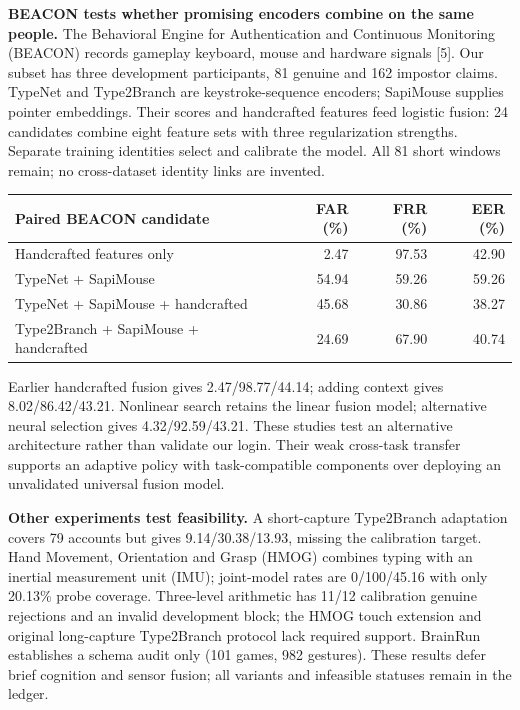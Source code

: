 \documentclass[10pt,a4paper]{article}
\newcommand{\smalltable}{\fontsize{8.5}{10.4}\selectfont}
\begin{document}
\textbf{BEACON tests whether promising encoders combine on the same people.} The Behavioral Engine for Authentication and Continuous Monitoring (BEACON) records gameplay keyboard, mouse and hardware signals [5]. Our subset has three development participants, 81 genuine and 162 impostor claims. TypeNet and Type2Branch are keystroke-sequence encoders; SapiMouse supplies pointer embeddings. Their scores and handcrafted features feed logistic fusion: 24 candidates combine eight feature sets with three regularization strengths. Separate training identities select and calibrate the model. All 81 short windows remain; no cross-dataset identity links are invented.
\begin{center}\smalltable
\begin{tabularx}{\linewidth}{@{}Xrrr@{}}
\toprule
\textbf{Paired BEACON candidate} & \textbf{FAR (\%)} & \textbf{FRR (\%)} & \textbf{EER (\%)}\\\midrule
Handcrafted features only & 2.47 & 97.53 & 42.90\\
TypeNet + SapiMouse & 54.94 & 59.26 & 59.26\\
TypeNet + SapiMouse + handcrafted & 45.68 & 30.86 & 38.27\\
Type2Branch + SapiMouse + handcrafted & 24.69 & 67.90 & 40.74\\\bottomrule
\end{tabularx}
\end{center}
Earlier handcrafted fusion gives 2.47/98.77/44.14; adding context gives 8.02/86.42/43.21. Nonlinear search retains the linear fusion model; alternative neural selection gives 4.32/92.59/43.21. These studies test an alternative architecture rather than validate our login. Their weak cross-task transfer supports an adaptive policy with task-compatible components over deploying an unvalidated universal fusion model.

\textbf{Other experiments test feasibility.} A short-capture Type2Branch adaptation covers 79 accounts but gives 9.14/30.38/13.93, missing the calibration target. Hand Movement, Orientation and Grasp (HMOG) combines typing with an inertial measurement unit (IMU); joint-model rates are 0/100/45.16 with only 20.13\% probe coverage. Three-level arithmetic has 11/12 calibration genuine rejections and an invalid development block; the HMOG touch extension and original long-capture Type2Branch protocol lack required support. BrainRun establishes a schema audit only (101 games, 982 gestures). These results defer brief cognition and sensor fusion; all variants and infeasible statuses remain in the ledger.
\end{document}
